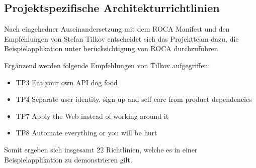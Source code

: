 \subsection{Projektspezifische Architekturrichtlinien}
Nach eingehedner Auseinandersetzung mit dem ROCA Manifest und den Empfehlungen von Stefan Tilkov entscheidet sich das Projektteam dazu, die Beispielapplikation unter berücksichtigung von ROCA durchzuführen.

Ergänzend werden folgende Empfehlungen von Tilkov aufgegriffen:

\begin{itemize}
	\item TP3 Eat your own API dog food
	\item TP4 Separate user identity, sign-up and self-care from product dependencies
	\item TP7 Apply the Web instead of working around it
	\item TP8 Automate everything or you will be hurt
\end{itemize}

Somit ergeben sich insgesamt 22 Richtlinien, welche es in einer Beispielapplikation zu demonstrieren gilt.







